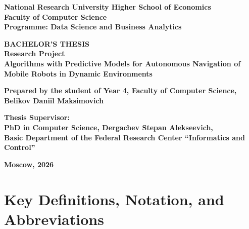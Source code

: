 \documentclass[12pt, a4paper]{article}
\begin{document}
\begin{titlepage}
\newpage

{
\begin{center}
\textbf{National Research University Higher School of Economics}\\[12pt]
\textbf{Faculty of Computer Science}\\[2pt]
\textbf{Programme: Data Science and Business Analytics}
\end{center}
}

\vspace{5em}

\begin{center}
\textbf{BACHELOR'S THESIS}\\[6pt]
\textbf{Research Project}\\[6pt]
\textbf{Algorithms with Predictive Models for Autonomous Navigation of Mobile Robots in Dynamic Environments}
\end{center}

\vspace{5em}

\textbf{Prepared by the student of Year 4, Faculty of Computer Science,}\\
\textbf{Belikov Daniil Maksimovich}

\vspace{2em}

\textbf{Thesis Supervisor:}\\
\textbf{PhD in Computer Science, Dergachev Stepan Alekseevich,}\\
\textbf{Basic Department of the Federal Research Center ``Informatics and Control''}

\vspace{\fill}

\begin{center}
\textbf{Moscow, 2026}
\end{center}
\end{titlepage}

\tableofcontents
\newpage

\section*{Key Definitions, Notation, and Abbreviations}
\end{document}
